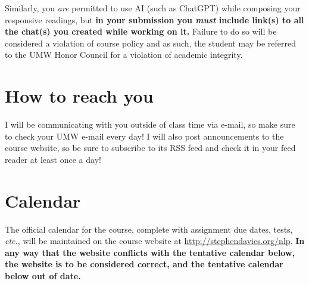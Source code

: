 \documentclass[12pt]{article}
\begin{document}
Similarly, you \textit{are} permitted to use AI (such as ChatGPT) while
composing your responsive readings, but \textbf{in your submission you
\textit{must} include link(s) to all the chat(s) you created while working on
it.} Failure to do so will be considered a violation of course policy and as
such, the student may be referred to the UMW Honor Council for a violation of
academic integrity.



\section*{How to reach you}

I will be communicating with you outside of class time via e-mail, so make
sure to check your UMW e-mail every day! I will also post announcements to
the course website, so be sure to subscribe to its RSS feed and check it in
your feed reader at least once a day!

\section*{Calendar}

The official calendar for the course, complete with assignment due dates,
tests, \textit{etc.}, will be maintained on the course website at
\url{http://stephendavies.org/nlp}. \textbf{In any way that the website
conflicts with the tentative calendar below, the website is to be considered
correct, and the tentative calendar below out of date.}
\end{document}
